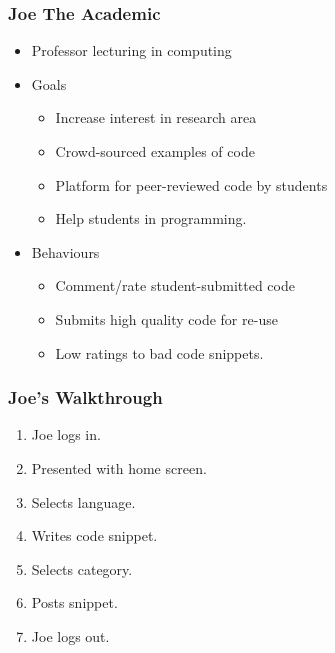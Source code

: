 \documentclass[handout, t]{beamer}
\begin{document}
\begin{frame}
\frametitle{Joe The Academic}
\begin{itemize}
\item Professor lecturing in computing
\item Goals
    \begin{itemize}
    \item Increase interest in research area
    \item Crowd-sourced examples of code
    \item Platform for peer-reviewed code by students
    \item Help students in programming.
    \end{itemize}
\item Behaviours
    \begin{itemize}
    \item Comment/rate student-submitted code
    \item Submits high quality code for re-use
    \item Low ratings to bad code snippets.
    \end{itemize}
\end{itemize}
\end{frame}



\begin{frame}
\frametitle{Joe's Walkthrough}
\begin{enumerate}
\item Joe logs in.
\item Presented with home screen.
\item Selects language.
\item Writes code snippet.
\item Selects category.
\item Posts snippet.
\item Joe logs out.
\end{enumerate}
\end{frame}
\end{document}
